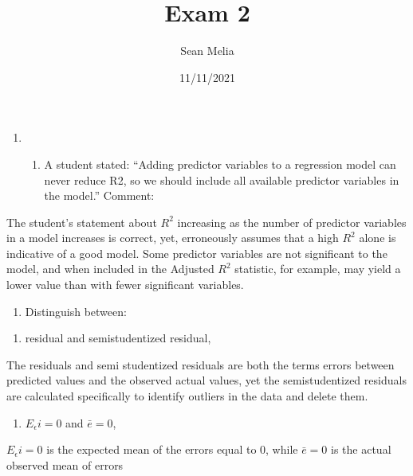 \documentclass[
]{article}
\title{Exam 2}
\author{Sean Melia}
\date{11/11/2021}
\providecommand{\tightlist}{%
  \setlength{\itemsep}{0pt}\setlength{\parskip}{0pt}}
\begin{document}
\maketitle

\begin{enumerate}
\def\labelenumi{\arabic{enumi})}
\item
  \begin{enumerate}
  \def\labelenumii{(\alph{enumii})}
  \tightlist
  \item
    A student stated: ``Adding predictor variables to a regression model
    can never reduce R2, so we should include all available predictor
    variables in the model.'' Comment:
  \end{enumerate}
\end{enumerate}

The student's statement about \(R^2\) increasing as the number of
predictor variables in a model increases is correct, yet, erroneously
assumes that a high \(R^2\) alone is indicative of a good model. Some
predictor variables are not significant to the model, and when included
in the Adjusted \(R^2\) statistic, for example, may yield a lower value
than with fewer significant variables.

\begin{enumerate}
\def\labelenumi{(\alph{enumi})}
\setcounter{enumi}{1}
\tightlist
\item
  Distinguish between:
\end{enumerate}

\begin{enumerate}
\def\labelenumi{\roman{enumi}.}
\tightlist
\item
  residual and semistudentized residual,
\end{enumerate}

The residuals and semi studentized residuals are both the terms errors
between predicted values and the observed actual values, yet the
semistudentized residuals are calculated specifically to identify
outliers in the data and delete them.

\begin{enumerate}
\def\labelenumi{\roman{enumi}.}
\setcounter{enumi}{1}
\tightlist
\item
  \(E_{\epsilon}i = 0\) and \(\bar{e} = 0\),
\end{enumerate}

\(E_{\epsilon}i = 0\) is the expected mean of the errors equal to 0,
while \(\bar{e} = 0\) is the actual observed mean of errors
\end{document}
